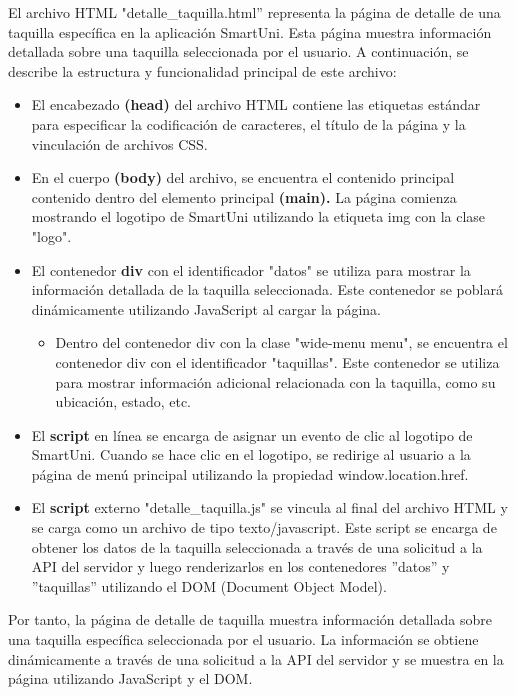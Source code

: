 \documentclass[12pt]{report}
\begin{document}
El archivo HTML "detalle\_taquilla.html'' representa la página de detalle de una taquilla específica en la aplicación SmartUni. Esta página muestra información detallada sobre una taquilla seleccionada por el usuario. A continuación, se describe la estructura y funcionalidad principal de este archivo:

\begin{itemize}
    \item El encabezado \textbf{(head)} del archivo HTML contiene las etiquetas estándar para especificar la codificación de caracteres, el título de la página y la vinculación de archivos CSS.

    \item En el cuerpo \textbf{(body)} del archivo, se encuentra el contenido principal contenido dentro del elemento principal\textbf{ (main).} La página comienza mostrando el logotipo de SmartUni utilizando la etiqueta img con la clase "logo".

    \item El contenedor \textbf{div} con el identificador "datos" se utiliza para mostrar la información detallada de la taquilla seleccionada. Este contenedor se poblará dinámicamente utilizando JavaScript al cargar la página.

    \begin{itemize}
        \item Dentro del contenedor div con la clase "wide-menu menu", se encuentra el contenedor div con el identificador "taquillas". Este contenedor se utiliza para mostrar información adicional relacionada con la taquilla, como su ubicación, estado, etc.
    \end{itemize}

    \item El \textbf{script} en línea se encarga de asignar un evento de clic al logotipo de SmartUni. Cuando se hace clic en el logotipo, se redirige al usuario a la página de menú principal utilizando la propiedad window.location.href.

    \item El \textbf{script} externo "detalle\_taquilla.js" se vincula al final del archivo HTML y se carga como un archivo de tipo texto/javascript. Este script se encarga de obtener los datos de la taquilla seleccionada a través de una solicitud a la API del servidor y luego renderizarlos en los contenedores ''datos'' y ''taquillas'' utilizando el DOM (Document Object Model).
\end{itemize}
Por tanto, la página de detalle de taquilla muestra información detallada sobre una taquilla específica seleccionada por el usuario. La información se obtiene dinámicamente a través de una solicitud a la API del servidor y se muestra en la página utilizando JavaScript y el DOM.
\end{document}
